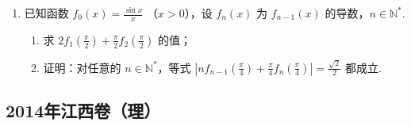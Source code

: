 \begin{description}
\begin{enumerate}[leftmargin=5pt]
        \item 已知函数 \( f_{0}(x) = \frac{\sin x}{x} \) （\(x > 0\)），设 \(f_{n}(x)\) 为 \(f_{n-1}(x)\) 的导数，\(n \in \mathbb{N}^{*}\).
\begin{enumerate}
\item 求 \(2f_{1}\left(\frac{\pi}{2}\right) + \frac{\pi}{2}f_{2}\left(\frac{\pi}{2}\right)\) 的值；
\item 证明：对任意的 \(n \in \mathbb{N}^{*}\)，等式 \(\left|n f_{n-1}\left(\frac{\pi}{4}\right) + \frac{\pi}{4}f_{n}\left(\frac{\pi}{4}\right)\right| = \frac{\sqrt{2}}{2}\) 都成立.
\end{enumerate}

    \end{enumerate}

\end{description}


\subsection{2014年江西卷（理）}\label{gk:2014年江西卷（理）}

